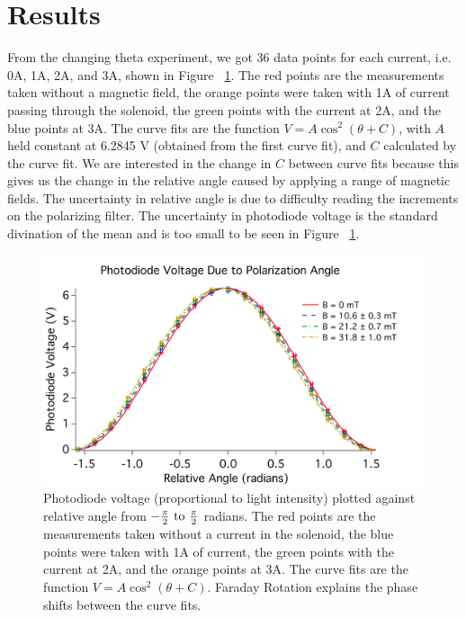 \documentclass[prb,preprint]{revtex4-1}
\begin{document}
\section{Results}

From the changing theta experiment, we got 36 data points for each current, i.e. 0A, 1A, 2A, and 3A, shown in Figure ~\ref{V_ThetaRel_Plot}. The red points are the measurements taken without a magnetic field, the orange points were taken with 1A of current passing through the solenoid, the green points with the current at 2A, and the blue points at 3A.  The curve fits are the function $V = A \cos^{2}(\theta + C)$, with $A$ held constant at 6.2845 V (obtained from the first curve fit), and $C$ calculated by the curve fit. We are interested in the change in $C$ between curve fits because this gives us the change in the relative angle caused by applying a range of magnetic fields. The uncertainty in relative angle is due to difficulty reading the increments on the polarizing filter. The uncertainty in photodiode voltage is the standard divination of the mean and is too small to be seen in Figure ~\ref{V_ThetaRel_Plot}.

\begin{figure}[h!]
\centering

\includegraphics[width=6in]{V_ThetaRel_Plot.pdf}
\caption{Photodiode voltage (proportional to light intensity) plotted against relative angle from $-\frac{\pi}{2} \rm{\ to\ } \frac{\pi}{2}$ radians.  The red points are the measurements taken without a current in the solenoid, the blue points were taken with 1A of current, the green points with the current at 2A, and the orange points at 3A.  The curve fits are the function $V = A \cos^{2}(\theta + C) $. Faraday Rotation explains the phase shifts between the curve fits.}

\label{V_ThetaRel_Plot}
\end{figure}
\end{document}
